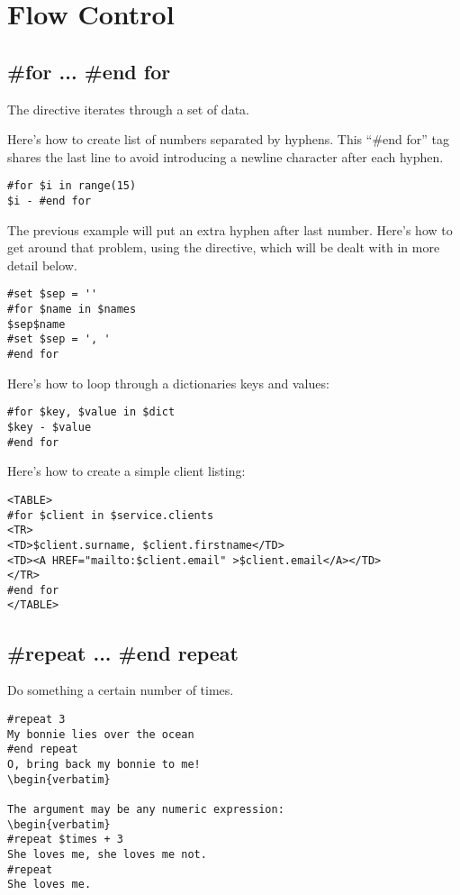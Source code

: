 \section{Flow Control}
\label{flowControl}


\subsection{\#for ... \#end for}
\label{flowControl.for}

The  directive iterates through a set of data.

Here's how to create list of numbers separated by hyphens. This ``\#end for''
tag shares the last line to avoid introducing a newline character after each
hyphen.  
\begin{verbatim}
#for $i in range(15)
$i - #end for
\end{verbatim}

The previous example will put an extra hyphen after last number.  Here's how to
get around that problem, using the  directive, which will be dealt
with in more detail below.
\begin{verbatim}
#set $sep = '' 
#for $name in $names 
$sep$name 
#set $sep = ', ' 
#end for 
\end{verbatim}

Here's how to loop through a dictionaries keys and values:
\begin{verbatim}
#for $key, $value in $dict
$key - $value
#end for
\end{verbatim}

Here's how to create a simple client listing:
\begin{verbatim}
<TABLE>
#for $client in $service.clients
<TR>
<TD>$client.surname, $client.firstname</TD>
<TD><A HREF="mailto:$client.email" >$client.email</A></TD>
</TR>
#end for
</TABLE>
\end{verbatim}


\subsection{\#repeat ... \#end repeat}
\label{flowControl.repeat}

Do something a certain number of times.
\begin{verbatim}
#repeat 3
My bonnie lies over the ocean
#end repeat
O, bring back my bonnie to me!
\begin{verbatim}

The argument may be any numeric expression:
\begin{verbatim}
#repeat $times + 3
She loves me, she loves me not.
#repeat
She loves me.
\end{verbatim}

